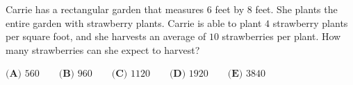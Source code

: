 Carrie has a rectangular garden that measures $6$ feet by $8$ feet. She plants the entire garden with strawberry plants. Carrie is able to plant $4$ strawberry plants per square foot, and she harvests an average of $10$ strawberries per plant. How many strawberries can she expect to harvest?

$\textbf{(A) }560 \qquad \textbf{(B) }960 \qquad \textbf{(C) }1120 \qquad \textbf{(D) }1920 \qquad \textbf{(E) }3840$
